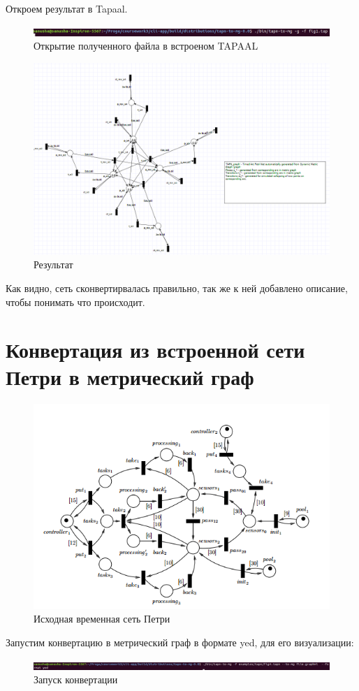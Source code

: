 \documentclass{../TechDoc}
\begin{document}
	Откроем результат в Tapaal\cite{tapaal}.
	
	\begin{figure}[h!]
		\centering
		\includegraphics[width=0.7\linewidth]{run_tapaal}
		\caption{Открытие полученного файла в встроеном TAPAAL}
		\label{fig:runtapaal}
	\end{figure}
	
	\newpage
	\begin{figure}
		\centering
		\includegraphics[width=0.9\linewidth]{result_tapn}
		\caption{Результат}
		\label{fig:resulttapn}
	\end{figure}
	Как видно, сеть сконвертирвалась правильно, так же к ней добавлено описание, чтобы понимать что происходит.

	\section{Конвертация из встроенной сети Петри в метрический граф}
	\begin{figure}[h!]
		\centering
		\includegraphics[width=0.7\linewidth]{fig4}
		\caption{Исходная временная сеть Петри\cite{CorMgTapn}}
		\label{fig:fig4}
	\end{figure}
	Запустим конвертацию в метрический граф в формате yed, для его визуализации:
	\begin{figure}[h!]
		\centering
		\includegraphics[width=0.7\linewidth]{run_to_mg}
		\caption{Запуск конвертации}
		\label{fig:runtomg}
	\end{figure}
	
\end{document}
